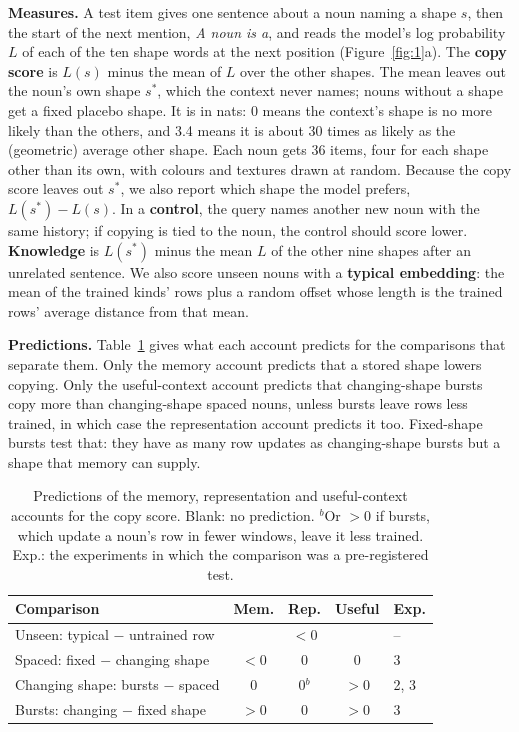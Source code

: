 \documentclass[11pt]{article}
\begin{document}
\textbf{Measures.} A test item gives one sentence about a noun naming a shape $s$, then the start of the next mention, \emph{A \textit{noun} is a}, and reads the model's log probability $L$ of each of the ten shape words at the next position (Figure~\ref{fig:1}a). The \textbf{copy score} is $L(s)$ minus the mean of $L$ over the other shapes. The mean leaves out the noun's own shape $s^*$, which the context never names; nouns without a shape get a fixed placebo shape. It is in nats: 0 means the context's shape is no more likely than the others, and 3.4 means it is about 30 times as likely as the (geometric) average other shape. Each noun gets 36 items, four for each shape other than its own, with colours and textures drawn at random. Because the copy score leaves out $s^*$, we also report which shape the model prefers, $L(s^*) - L(s)$. In a \textbf{control}, the query names another new noun with the same history; if copying is tied to the noun, the control should score lower. \textbf{Knowledge} is $L(s^*)$ minus the mean $L$ of the other nine shapes after an unrelated sentence. We also score unseen nouns with a \textbf{typical embedding}: the mean of the trained kinds' rows plus a random offset whose length is the trained rows' average distance from that mean.

\textbf{Predictions.} Table~\ref{tab:pred} gives what each account predicts for the comparisons that separate them. Only the memory account predicts that a stored shape lowers copying. Only the useful-context account predicts that changing-shape bursts copy more than changing-shape spaced nouns, unless bursts leave rows less trained, in which case the representation account predicts it too. Fixed-shape bursts test that: they have as many row updates as changing-shape bursts but a shape that memory can supply.

\begin{table}[t]
\centering
\small
\setlength{\tabcolsep}{2pt}
\begin{tabular}{@{}p{}cccl@{}}
\toprule
Comparison & Mem. & Rep. & Useful & Exp. \\
\midrule
Unseen: typical $-$ untrained row & & $<$0 & & -- \\
Spaced: fixed $-$ changing shape & $<$0 & 0 & 0 & 3 \\
Changing shape: bursts $-$ spaced & 0 & 0$^b$ & $>$0 & 2, 3 \\
Bursts: changing $-$ fixed shape & $>$0 & 0 & $>$0 & 3 \\
\bottomrule
\end{tabular}
\caption{Predictions of the memory, representation and useful-context accounts for the copy score. Blank: no prediction. $^b$Or $>$0 if bursts, which update a noun's row in fewer windows, leave it less trained. Exp.: the experiments in which the comparison was a pre-registered test.}
\label{tab:pred}
\end{table}
\end{document}
